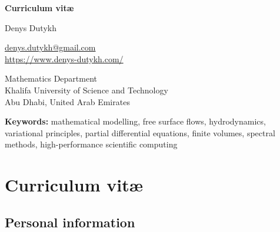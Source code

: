 \documentclass[final, a4paper, oneside, 12pt]{article}
\makeatletter
\numberwithin{equation}{section}
\renewenvironment{titlepage}
 {%
  \if@twocolumn
    \@restonecoltrue\onecolumn
  \else
    \@restonecolfalse\newpage
  \fi
  \thispagestyle{empty}%
 }
 {%
  \if@restonecol
    \twocolumn
  \else
    \newpage
  \fi
 }
\makeatother
\begin{document}
\thispagestyle{empty}


\begin{titlepage}

\vspace*{2cm}
\begin{center}
\Huge\bf Curriculum vit\ae \\
\end{center}
\vspace*{2.7cm}
\begin{center}
\Large\sc Denys Dutykh
\end{center}
\vspace*{0.5em}
\begin{center}
\large
\href{mailto:denys.dutykh@gmail.com}{denys.dutykh@gmail.com} \\
\url{https://www.denys-dutykh.com/}
\end{center}

\vspace*{0.5em}

\begin{center}
\large
Mathematics Department \\
Khalifa University of Science and Technology \\
Abu Dhabi, United Arab Emirates
\end{center}
\vspace*{7cm}
\begin{center}
  \textbf{Keywords:} mathematical modelling, free surface flows, hydrodynamics, variational principles, partial differential equations, finite volumes, spectral methods, high-performance scientific computing
\end{center}

\end{titlepage}


\thispagestyle{empty}
\tableofcontents


\section{Curriculum vit\ae}

\subsection{Personal information}
\end{document}
